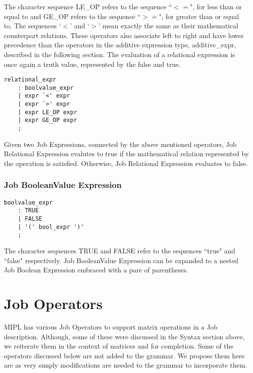 \documentclass[prodmode,acmtecs]{acmsmall}
\begin{document}
The character sequence LE\_OP refers to the sequence ``$<=$", for less 
than or equal to and GE\_OP refers to the sequence ``$>=$", for greater 
than or equal to. The sequences `$<$' and `$>$' mean exactly the same as 
their mathematical counterpart relations. These operators also associate 
left to right and have lower precedence than the operators in the additive 
expression type, additive\_expr, described in the following section. The 
evaluation of a relational expression is once again a truth value, 
represented by the false and true. 

\begin{lstlisting}
relational_expr
	: boolvalue_expr
	| expr `<' expr
	| expr `>' expr
	| expr LE_OP expr
	| expr GE_OP expr
	;
\end{lstlisting}

Given two Job Expressions, connected by the above mentioned operators, 
Job Relational Expression evalutes to true if the mathematical relation
represented by the operation is satisfied. Otherwise, Job Relational
Expression evaluates to false. 
\medskip


\subsubsection{Job BooleanValue Expression}

\begin{lstlisting}
boolvalue_expr
	: TRUE
	| FALSE
	| '(' bool_expr ')'
	;
\end{lstlisting}

The character sequences TRUE and FALSE refer to the sequences ``true"
and ``false" respectively.  Job BooleanValue Expression can be expanded
to a nested Job Boolean Expression embraced with a pare of parentheses.
\medskip


\section{Job Operators}
MIPL has various Job Operators to support matrix operations in a Job
description. Although, some of these were discussed in the Syntax
section above, we reiterate them in the context of matrices and for
completion. Some of the operators discussed below are not added to 
the grammar. We propose them here are as very simply modifications 
are needed to the grammar to incorporate them.
\end{document}
